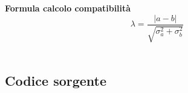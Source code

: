 \documentclass[a4paper,11pt,oneside]{article}
\begin{document}
\textbf{Formula calcolo compatibilità}\\
\begin{equation*}
    \lambda=\frac{\left|a-b\right|}{\sqrt{\sigma^{2}_{a}+\sigma^{2}_{b}}}
\end{equation*}\\


\subsection{Codice sorgente}
\begin{lstlisting}[language=C++, label=lst:statistica.h, caption=statistica.h]
\end{lstlisting}

 
\end{document}

